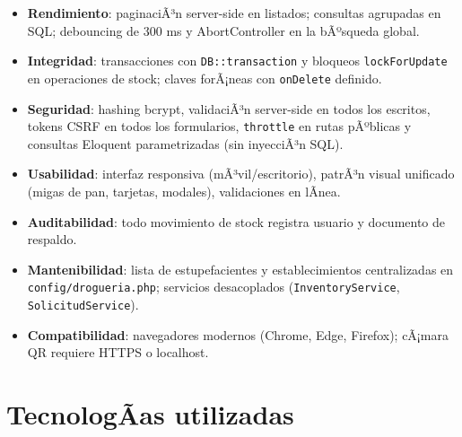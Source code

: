 ﻿\documentclass[a4paper, 12pt]{article}
\begin{document}
\begin{itemize}
    \item \textbf{Rendimiento}: paginaciÃ³n server-side en listados; consultas agrupadas en SQL; debouncing de 300 ms y AbortController en la bÃºsqueda global.
    \item \textbf{Integridad}: transacciones con \texttt{DB::transaction} y bloqueos \texttt{lockForUpdate} en operaciones de stock; claves forÃ¡neas con \texttt{onDelete} definido.
    \item \textbf{Seguridad}: hashing bcrypt, validaciÃ³n server-side en todos los escritos, tokens CSRF en todos los formularios, \texttt{throttle} en rutas pÃºblicas y consultas Eloquent parametrizadas (sin inyecciÃ³n SQL).
    \item \textbf{Usabilidad}: interfaz responsiva (mÃ³vil/escritorio), patrÃ³n visual unificado (migas de pan, tarjetas, modales), validaciones en lÃ­nea.
    \item \textbf{Auditabilidad}: todo movimiento de stock registra usuario y documento de respaldo.
    \item \textbf{Mantenibilidad}: lista de estupefacientes y establecimientos centralizadas en \texttt{config/drogueria.php}; servicios desacoplados (\texttt{InventoryService}, \texttt{SolicitudService}).
    \item \textbf{Compatibilidad}: navegadores modernos (Chrome, Edge, Firefox); cÃ¡mara QR requiere HTTPS o localhost.
\end{itemize}

\section{TecnologÃ­as utilizadas}
\end{document}
